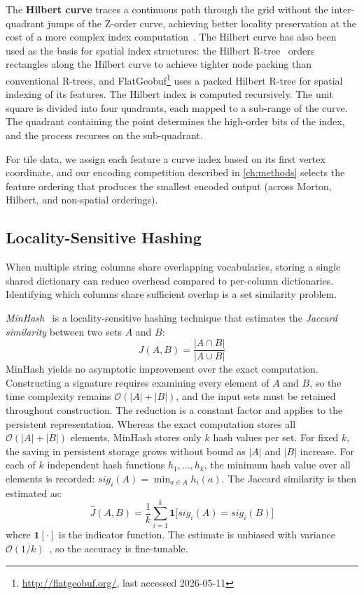 The \textbf{Hilbert curve} traces a continuous path through the grid without the inter-quadrant jumps of the Z-order curve, achieving better locality preservation at the cost of a more complex index computation~\cite{moonAnalysisClusteringProperties2001}.
The Hilbert curve has also been used as the basis for spatial index structures: the Hilbert R-tree~\cite{kamelHilbertRtreeImproved1994} orders rectangles along the Hilbert curve to achieve tighter node packing than conventional R-trees, and FlatGeobuf\footnote{\url{http://flatgeobuf.org/}, last accessed 2026-05-11} uses a packed Hilbert R-tree for spatial indexing of its features.
The Hilbert index is computed recursively.
The unit square is divided into four quadrants, each mapped to a sub-range of the curve.
The quadrant containing the point determines the high-order bits of the index, and the process recurses on the sub-quadrant.

For tile data, we assign each feature a curve index based on its first vertex coordinate, and our encoding competition described in \cref{ch:methods} selects the feature ordering that produces the smallest encoded output (across Morton, Hilbert, and non-spatial orderings).

\subsection{Locality-Sensitive Hashing}\label{sub:lsh}

When multiple string columns share overlapping vocabularies, storing a single shared dictionary can reduce overhead compared to per-column dictionaries.
Identifying which columns share sufficient overlap is a set similarity problem.

\emph{MinHash}~\cite{broderResemblanceContainmentDocuments1998} is a locality-sensitive hashing technique that estimates the \emph{Jaccard similarity} between two sets $A$ and $B$:
\begin{equation}\label{eq:jaccard}
    J(A, B) = \frac{|A \cap B|}{|A \cup B|}
\end{equation}
MinHash yields no asymptotic improvement over the exact computation.
Constructing a signature requires examining every element of $A$ and $B$, so the time complexity remains $\mathcal{O}(|A|+|B|)$, and the input sets must be retained throughout construction.
The reduction is a constant factor and applies to the persistent representation.
Whereas the exact computation stores all $\mathcal{O}(|A|+|B|)$ elements, MinHash stores only $k$ hash values per set.
For fixed $k$, the saving in persistent storage grows without bound as $|A|$ and $|B|$ increase.
For each of $k$ independent hash functions $h_1, \ldots, h_k$, the minimum hash value over all elements is recorded: $\mathit{sig}_i(A) = \min_{a \in A} h_i(a)$.
The Jaccard similarity is then estimated as:
\begin{equation}\label{eq:minhash}
    \hat{J}(A, B) = \frac{1}{k} \sum_{i=1}^{k} \mathbf{1}\bigl[\mathit{sig}_i(A) = \mathit{sig}_i(B)\bigr]
\end{equation}
where $\mathbf{1}[\cdot]$ is the indicator function.
The estimate is unbiased with variance $\mathcal{O}(1/k)$~\cite{broderResemblanceContainmentDocuments1998}, so the accuracy is fine-tunable.


